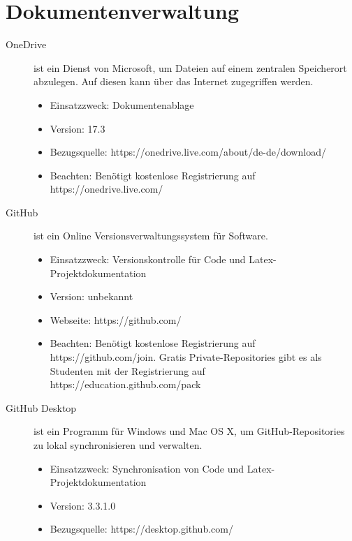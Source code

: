 


\section{Dokumentenverwaltung}

\begin{description}
	\item [OneDrive] ist ein Dienst von Microsoft, um Dateien auf einem zentralen Speicherort abzulegen. Auf diesen kann über das Internet zugegriffen werden. \cite{wikipedia_filehosting} \cite{wikipedia_oneDrive}
	\begin{itemize}
		\item Einsatzzweck: Dokumentenablage
		\item Version: 17.3
		\item Bezugsquelle: https://onedrive.live.com/about/de-de/download/
		\item Beachten: Benötigt kostenlose Registrierung auf https://onedrive.live.com/
	\end{itemize}
	
	
	\item [GitHub] ist ein Online Versionsverwaltungssystem für Software.
	\begin{itemize}
		\item Einsatzzweck: Versionskontrolle für Code und Latex-Projektdokumentation
		\item Version: unbekannt
		\item Webseite: https://github.com/
		\item Beachten: Benötigt kostenlose Registrierung auf https://github.com/join. Gratis Private-Repositories gibt es als Studenten mit der Registrierung auf https://education.github.com/pack
	\end{itemize}
	
	
	\item [GitHub Desktop] ist ein Programm für Windows und Mac OS X, um GitHub-Repositories zu lokal synchronisieren und verwalten.
	\begin{itemize}
		\item Einsatzzweck: Synchronisation von Code und Latex-Projektdokumentation
		\item Version: 3.3.1.0
		\item Bezugsquelle: https://desktop.github.com/
	\end{itemize}
\end{description}



